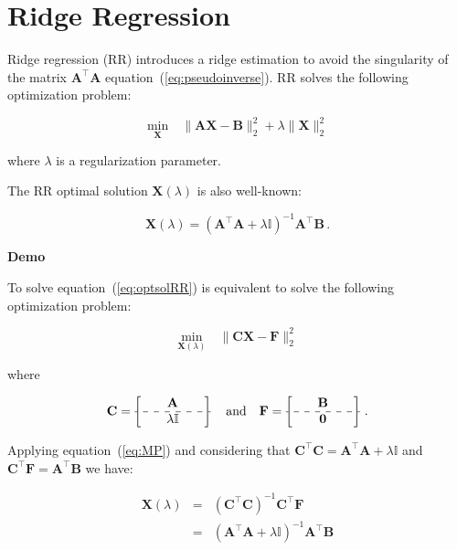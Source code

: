 \section{Ridge Regression}\label{sec:RR}

Ridge regression (RR) introduces a ridge estimation to avoid the
singularity of the matrix $\mathbf{A}^\top \mathbf{A}$
equation~(\ref{eq:pseudoinverse}). RR solves the following
optimization problem:

\begin{equation}
\label{eq:RRproblem}
\underset{\mathbf{X}}{\text{min}} \quad \|
\mathbf{A}\mathbf{\mathbf{X}} - \mathbf{B} \|_2^2 +\lambda \|
\mathbf{\mathbf{X}}\|_2^2 
\end{equation}

\noindent where $\lambda$ is a regularization parameter. 

The RR optimal solution $\mathbf{X}(\lambda)$ is also well-known: 

\begin{equation}
\label{eq:optsolRR}
\mathbf{X}(\lambda)=(\mathbf{A}^\top \mathbf{A}+ \lambda
\mathbb{I})^{-1}\mathbf{A}^\top \mathbf{B} \, . 
\end{equation}


\textbf{Demo}\quad

To solve equation~(\ref{eq:optsolRR}) is equivalent to solve the following
optimization problem:


\begin{equation}
\label{eq:RRproblem2}
\underset{\mathbf{X}(\lambda)}{\text{min}} \quad \|
\mathbf{C}\mathbf{\mathbf{X}} - \mathbf{F} \|_2^2
\end{equation}

\noindent where

\begin{equation*}
	\mathbf{C}=\begin{bmatrix} \quad &\mathbf{A}& \quad \\ \hdashline \quad
& \lambda\mathbb{I}&\quad  \end{bmatrix} \quad \text{and} \quad
	\mathbf{F}=\begin{bmatrix} \quad &\mathbf{B}& \quad \\ \hdashline \quad
& \mathbf{0}&\quad  \end{bmatrix} \, .
\end{equation*}

Applying equation~(\ref{eq:MP}) and considering that $\mathbf{C}^\top
\mathbf{C} = \mathbf{A}^\top \mathbf{A} + \lambda \mathbb{I}$ and 
$\mathbf{C}^\top \mathbf{F}=\mathbf{A}^\top \mathbf{B} $ we have:

\begin{eqnarray*}
\mathbf{X}(\lambda)&=&(\mathbf{C}^\top
\mathbf{C})^{-1}\mathbf{C}^\top \mathbf{F} \\
&=& (\mathbf{A}^\top \mathbf{A} + \lambda \mathbb{I})^{-1} \mathbf{A}^\top \mathbf{B}
\end{eqnarray*}



